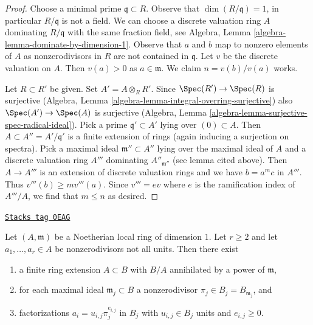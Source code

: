 \begin{proof}
Choose a minimal prime $\mathfrak q \subset R$. Observe that
$\dim(R/\mathfrak q) = 1$, in particular $R/\mathfrak q$ is not a field.
We can choose a discrete valuation ring $A$ dominating $R/\mathfrak q$
with the same fraction field, see
Algebra, Lemma \ref{algebra-lemma-dominate-by-dimension-1}. Observe that
$a$ and $b$ map to nonzero elements of $A$ as nonzerodivisors in $R$
are not contained in $\mathfrak q$. Let $v$ be the discrete valuation on $A$.
Then $v(a) > 0$ as $a \in \mathfrak m$.
We claim $n = v(b)/v(a)$ works.

\medskip\noindent
Let $R \subset R'$ be given. Set $A' = A \otimes_R R'$.
Since $\Spec(R') \to \Spec(R)$ is surjective
(Algebra, Lemma \ref{algebra-lemma-integral-overring-surjective})
also $\Spec(A') \to \Spec(A)$ is surjective
(Algebra, Lemma \ref{algebra-lemma-surjective-spec-radical-ideal}).
Pick a prime $\mathfrak q' \subset A'$ lying over $(0) \subset A$.
Then $A \subset A'' = A'/\mathfrak q'$ is a finite extension of rings
(again inducing a surjection on spectra).
Pick a maximal ideal $\mathfrak m'' \subset A''$
lying over the maximal ideal of $A$ and a discrete valuation ring
$A'''$ dominating $A''_{\mathfrak m''}$ (see lemma cited above).
Then $A \to A'''$ is an extension of discrete valuation rings
and we have $b = a^m c$ in $A'''$. Thus $v'''(b) \geq mv'''(a)$.
Since $v''' = ev$ where $e$ is the ramification index
of $A'''/A$, we find that $m \leq n$ as desired.
\end{proof}

\begin{lemma}
\label{chow-lemma-prepare-tame-symbol}
\href{https://stacks.math.columbia.edu/tag/0EAG}{\texttt{Stacks tag 0EAG}}

Let $(A, \mathfrak m)$ be a Noetherian local ring of dimension $1$.
Let $r \geq 2$ and let $a_1, \ldots, a_r \in A$ be nonzerodivisors
not all units.
Then there exist
\begin{enumerate}
\item a finite ring extension $A \subset B$ with
$B/A$ annihilated by a power of $\mathfrak m$,
\item for each maximal ideal $\mathfrak m_j \subset B$
a nonzerodivisor $\pi_j \in B_j = B_{\mathfrak m_j}$, and
\item factorizations $a_i = u_{i, j} \pi_j^{e_{i, j}}$ in $B_j$
with $u_{i, j} \in B_j$ units and $e_{i, j} \geq 0$.
\end{enumerate}
\end{lemma}

